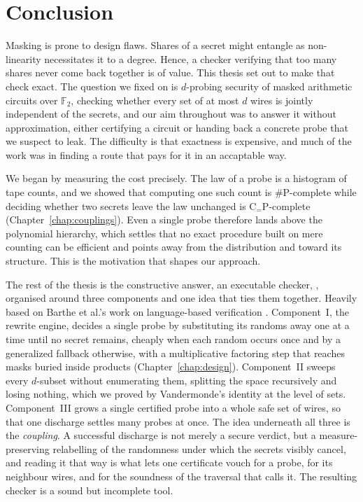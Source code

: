 \setlength{\parindent}{0pt}
\chapter{Conclusion}
\label{chap:conclusion}
Masking is prone to design flaws. Shares of a secret might entangle as non-linearity
necessitates it to a degree. Hence, a checker verifying that too many shares never come back
together is of value. This thesis set out to make that check exact. The question we fixed
on is $d$-probing security of masked arithmetic circuits over $\mathbb{F}_2$,
checking whether every set of at most $d$ wires is jointly independent of the secrets, and
our aim throughout was to answer it without approximation, either certifying a
circuit or handing back a concrete probe that we suspect to leak. The difficulty is that
exactness is expensive, and much of the work was in finding a route that pays for
it in an accaptable way.

We began by measuring the cost precisely. The law of a probe is a histogram of tape
counts, and we showed that computing one such count is $\#\mathrm{P}$-complete while
deciding whether two secrets leave the law unchanged is
$\mathrm{C}_{=}\mathrm{P}$-complete (Chapter~\ref{chap:couplings}). Even a single
probe therefore lands above the polynomial hierarchy, which settles that no exact
procedure built on mere counting can be efficient and points away from the distribution
and toward its structure. This is the motivation that shapes our approach.

The rest of the thesis is the constructive answer, an executable checker,
\toolname, organised around three components and one idea that ties them together.
Heavily based on Barthe et al.'s work on language-based verification
\parencite{barthe2015verified, 10.1007/978-3-030-29959-0_15}.
Component~I, the rewrite engine, decides a single probe by substituting its randoms
away one at a time until no secret remains, cheaply when each random occurs once
and by a generalized fallback otherwise, with a multiplicative factoring step that
reaches masks buried inside products (Chapter~\ref{chap:design}). Component~II
sweeps every $d$-subset without enumerating them, splitting the space recursively
and losing nothing, which we proved by Vandermonde's identity at the level
of sets. Component~III grows a single certified probe into a whole safe set of
wires, so that one discharge settles many probes at once. The idea underneath all
three is the \emph{coupling}. A successful discharge is not merely a secure verdict, but a
measure-preserving relabelling of the randomness under which the secrets visibly
cancel, and reading it that way is what lets one certificate vouch for a probe, for
its neighbour wires, and for the soundness of the traversal that calls it. The resulting
checker is a sound but incomplete tool.

